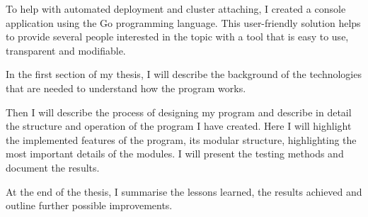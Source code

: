 To help with automated deployment and cluster attaching, I created a console application using the Go programming language.
This user-friendly solution helps to provide several people interested in the topic with a tool that is easy to use, transparent and modifiable.

In the first section of my thesis, I will describe the background of the technologies that are needed to understand how the program works.

Then I will describe the process of designing my program and describe in detail the structure and operation of the program I have created.
Here I will highlight the implemented features of the program, its modular structure, highlighting the most important details of the modules.
I will present the testing methods and document the results.

At the end of the thesis, I summarise the lessons learned, the results achieved and outline further possible improvements.

\vfill
\selectthesislanguage

\setcounter{romanPage}{\value{page}}

